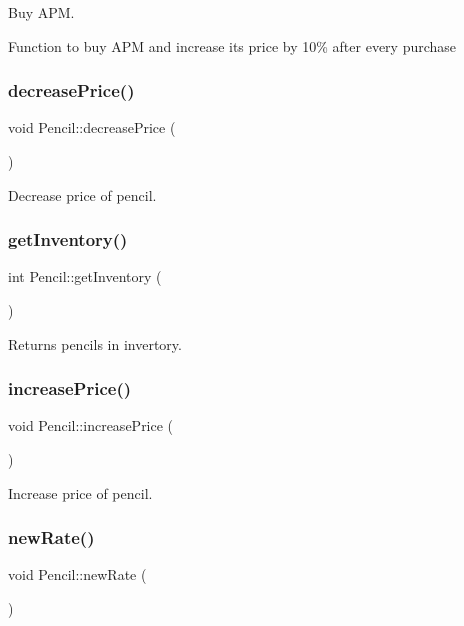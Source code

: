 Buy A\+PM.

Function to buy A\+PM and increase its price by 10\% after every purchase \mbox{\label{classPencil_a84aeeb98b1caa424d92c312e56e42797}} 
\subsubsection{\texorpdfstring{decrease\+Price()}{decreasePrice()}}
{\footnotesize\ttfamily void Pencil\+::decrease\+Price (\begin{DoxyParamCaption}{ }\end{DoxyParamCaption})}

Decrease price of pencil. \mbox{\label{classPencil_aa629f185016565c847bb0a401634f0e5}} 
\subsubsection{\texorpdfstring{get\+Inventory()}{getInventory()}}
{\footnotesize\ttfamily int Pencil\+::get\+Inventory (\begin{DoxyParamCaption}{ }\end{DoxyParamCaption})}

Returns pencils in invertory. \mbox{\label{classPencil_a075683b2e85f8819e71f365c097e5f61}} 
\subsubsection{\texorpdfstring{increase\+Price()}{increasePrice()}}
{\footnotesize\ttfamily void Pencil\+::increase\+Price (\begin{DoxyParamCaption}{ }\end{DoxyParamCaption})}

Increase price of pencil. \mbox{\label{classPencil_a759af90fe58f6399e831f2c53c0470bd}} 
\subsubsection{\texorpdfstring{new\+Rate()}{newRate()}}
{\footnotesize\ttfamily void Pencil\+::new\+Rate (\begin{DoxyParamCaption}{ }\end{DoxyParamCaption})}

